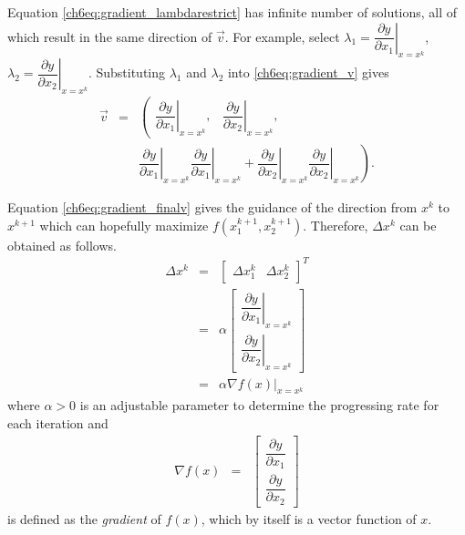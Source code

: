 Equation \eqref{ch6eq:gradient_lambdarestrict} has infinite number of solutions, all of which result in the same direction of $\vec{v}$. For example, select $\lambda_1 = \left.\dfrac{\partial y}{\partial x_1}\right|_{x=x^k}$, $\lambda_2 = \left.\dfrac{\partial y}{\partial x_2}\right|_{x=x^k}$. Substituting $\lambda_1$ and $\lambda_2$ into \eqref{ch6eq:gradient_v} gives
\begin{eqnarray}
  \vec{v} &=& \left(\begin{array}{cc}
              \left.\dfrac{\partial y}{\partial x_1}\right|_{x=x^k}, & \left.\dfrac{\partial y}{\partial x_2}\right|_{x=x^k},
            \end{array} \right. \nonumber \\
            && \left. \left.\dfrac{\partial y}{\partial x_1}\right|_{x=x^k} \left.\dfrac{\partial y}{\partial x_1}\right|_{x=x^k} + \left.\dfrac{\partial y}{\partial x_2}\right|_{x=x^k} \left.\dfrac{\partial y}{\partial x_2}\right|_{x=x^k} \right). \label{ch6eq:gradient_finalv}
\end{eqnarray}

Equation \eqref{ch6eq:gradient_finalv} gives the guidance of the direction from $x^k$ to $x^{k+1}$ which can hopefully maximize $f(x_1^{k+1}, x_2^{k+1})$. Therefore, $\Delta x^k$ can be obtained as follows.
\begin{eqnarray}
  \Delta x^k &=& \left[\begin{array}{cc}
                         \Delta x_1^k & \Delta x_2^k
                       \end{array}\right]^T \nonumber \\
  &=& \alpha \left[\begin{array}{c}
                         \left.\dfrac{\partial y}{\partial x_1}\right|_{x=x^k} \\
                         \left.\dfrac{\partial y}{\partial x_2}\right|_{x=x^k}
                       \end{array}\right] \nonumber \\
  &=& \alpha \left.\nabla f(x)\right|_{x=x^k}
\end{eqnarray}
where $\alpha > 0$ is an adjustable parameter to determine the progressing rate for each iteration and
\begin{eqnarray}
  \nabla f(x) &=& \left[\begin{array}{c}
                         \dfrac{\partial y}{\partial x_1} \\
                         \dfrac{\partial y}{\partial x_2}
                       \end{array}\right] \label{ch6eq:gradientdef}
\end{eqnarray}  
is defined as the \textit{gradient} of $f(x)$, which by itself is a vector function of $x$.
















